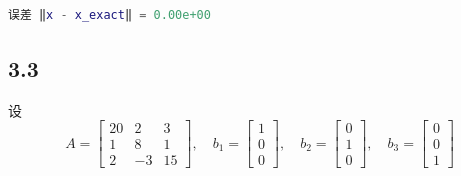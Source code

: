 \begin{lstlisting}[language=matlab]
误差 ‖x - x_exact‖ = 0.00e+00
\end{lstlisting}

\subsection*{3.3}
设
\[ A = \begin{bmatrix} 20 & 2 & 3 \\ 1 & 8 & 1 \\ 2 & -3 & 15 \end{bmatrix}, \quad b_1 = \begin{bmatrix} 1 \\ 0 \\ 0 \end{bmatrix}, \quad b_2 = \begin{bmatrix} 0 \\ 1 \\ 0 \end{bmatrix}, \quad b_3 = \begin{bmatrix} 0 \\ 0 \\ 1 \end{bmatrix} \]

